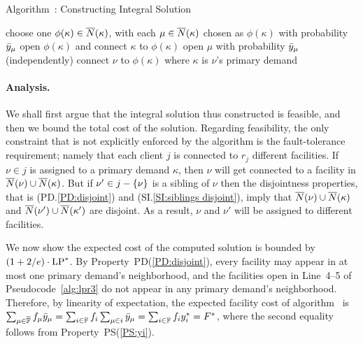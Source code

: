 
\begin{algorithm}
  \caption{Algorithm~{\ECHS}:
    Constructing Integral Solution}
  \label{alg:lpr3}
  \begin{algorithmic}[1]
    \State choose one $\phi(\kappa)\in {\overline{N}}(\kappa)$,
    with each $\mu\in{\overline{N}}(\kappa)$ chosen as $\phi(\kappa)$
    with probability ${\bar y}_\mu$
    \State open $\phi(\kappa)$ and connect $\kappa$ to $\phi(\kappa)$
    \EndFor
    \State open $\mu$ with probability ${\bar y}_\mu$ (independently)
    \EndFor
    \Else
    \State connect $\nu$ to $\phi(\kappa)$ where $\kappa$ is $\nu$'s
     primary demand
    \EndIf
    \EndFor
  \end{algorithmic}
\end{algorithm}


\paragraph{Analysis.}
We shall first argue that the integral solution thus
constructed is feasible, and then we bound the total cost of
the solution. Regarding feasibility, the only constraint that is
not explicitly enforced by the algorithm is the fault-tolerance
requirement; namely that each client $j$ is connected to $r_j$
different facilities. If $\nu\in j$ is assigned to a primary
demand $\kappa$, then $\nu$ will get connected to a facility in
${\overline{N}}(\nu)\cup {\overline{N}}(\kappa)$. But if $\nu'\in j-{ \left\{ \nu \right\} }$ is a sibling
of $\nu$ then the disjointness properties, that is
(PD.\ref{PD:disjoint}) and (SI.\ref{SI:siblings disjoint}),
imply that
${\overline{N}}(\nu)\cup {\overline{N}}(\kappa)$ and ${\overline{N}}(\nu')\cup {\overline{N}}(\kappa')$
are disjoint. As a result, $\nu$ and $\nu'$ will be assigned to
different facilities.



\medskip
We now show the expected cost of the computed solution is bounded by
$(1+2/e) \cdot \mbox{\rm LP}^\ast$. By
Property~PD(\ref{PD:disjoint}), every facility may appear in at
most one primary demand's neighborhood, and the facilities
open in Line~4--5 of Pseudocode~\ref{alg:lpr3} do not appear
in any primary demand's neighborhood. Therefore, by
linearity of expectation, the expected facility cost of
algorithm~{\ECHS} is $\sum_{\mu\in\overline{\mathbb{F}}}
f_\mu {\bar y}_{\mu} = \sum_{i\in\mathbb{F}} f_i\sum_{\mu\in i}
{\bar y}_{\mu} = \sum_{i\in\mathbb{F}} f_i y_i^\ast = F^\ast$,
where the second equality follows from Property~PS(\ref{PS:yi}).

